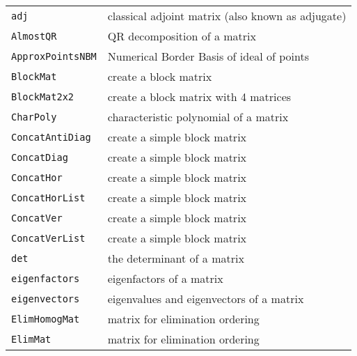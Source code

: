 \documentclass[a4paper]{mybook}
\begin{document}
\begin{center}
\begin{longtable}{ll}
   
{\verb~adj~} &
      classical adjoint matrix (also known as adjugate)\\
   
{\verb~AlmostQR~} &
      QR decomposition of a matrix\\
   
{\verb~ApproxPointsNBM~} &
      Numerical Border Basis of ideal of points\\
   
{\verb~BlockMat~} &
      create a block matrix\\
   
{\verb~BlockMat2x2~} &
      create a block matrix with 4 matrices\\
   
{\verb~CharPoly~} &
      characteristic polynomial of a matrix\\
   
{\verb~ConcatAntiDiag~} &
      create a simple block matrix\\
   
{\verb~ConcatDiag~} &
      create a simple block matrix\\
   
{\verb~ConcatHor~} &
      create a simple block matrix\\
   
{\verb~ConcatHorList~} &
      create a simple block matrix\\
   
{\verb~ConcatVer~} &
      create a simple block matrix\\
   
{\verb~ConcatVerList~} &
      create a simple block matrix\\
   
{\verb~det~} &
      the determinant of a matrix\\
   
{\verb~eigenfactors~} &
      eigenfactors of a matrix\\
   
{\verb~eigenvectors~} &
      eigenvalues and eigenvectors of a matrix\\
   
{\verb~ElimHomogMat~} &
      matrix for elimination ordering\\
   
{\verb~ElimMat~} &
      matrix for elimination ordering\\
   

\end{longtable}
\end{center}
\end{document}
